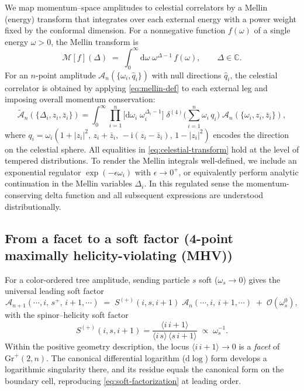 \documentclass[11pt]{article}
\begin{document}
We map momentum–space amplitudes to celestial correlators by a Mellin (energy) transform that integrates over each external energy with a power weight fixed by the conformal dimension. For a nonnegative function \(f(\omega)\) of a single energy \(\omega>0\), the Mellin transform is
\begin{equation}
\mathcal{M}[f](\Delta)
\;=\;
\int_{0}^{\infty}\!\mathrm{d}\omega\;
\omega^{\Delta-1}\,f(\omega),
\qquad
\Delta\in\mathbb{C}.
\label{eq:mellin-def}
\end{equation}
For an \(n\)-point amplitude \(\mathcal{A}_n(\{\omega_i,\hat{q}_i\})\) with null directions \(\hat{q}_i\), the celestial correlator is obtained by applying \eqref{eq:mellin-def} to each external leg and imposing overall momentum conservation:
\begin{equation}
\widetilde{\mathcal{A}}_n(\{\Delta_i,z_i,\bar z_i\})
=
\int_0^\infty \!\!\prod_{i=1}^{n}\Big[\mathrm{d}\omega_i\;\omega_i^{\Delta_i-1}\Big]\;
\delta^{(4)}\!\Big(\sum_{i=1}^{n}\omega_i\,q_i\Big)\;
\mathcal{A}_n(\{\omega_i,z_i,\bar z_i\}),
\label{eq:celestial-transform}
\end{equation}
where \(q_i=\omega_i(1+\lvert z_i\rvert^2,\,z_i+\bar z_i,\,-\mathrm{i}(z_i-\bar z_i),\,1-\lvert z_i\rvert^2)\) encodes the direction on the celestial sphere.
All equalities in \eqref{eq:celestial-transform} hold at the level of tempered distributions.
To render the Mellin integrals well-defined, we include an exponential regulator
\(\exp(-\epsilon \omega_i)\) with \(\epsilon \to 0^+\),
or equivalently perform analytic continuation in the Mellin variables \(\Delta_i\).
In this regulated sense the momentum-conserving delta function and all subsequent
expressions are understood distributionally.

\subsection{From a facet to a soft factor (4-point maximally helicity-violating (MHV))}
For a color-ordered tree amplitude, sending particle \(s\) soft (\(\omega_s\to0\)) gives the universal leading soft factor
\begin{equation}
\mathcal{A}_{n+1}(\cdots,i,\,s^{+},\,i{+}1,\cdots)
\;=\;
S^{(+)}(i,s,i{+}1)\;\mathcal{A}_{n}(\cdots,i,\,i{+}1,\cdots)
\;+\;\mathcal{O}(\omega_s^{0}),
\label{eq:soft-factorization}
\end{equation}
with the spinor–helicity soft factor
\begin{equation}
S^{(+)}(i,s,i{+}1)
=
\frac{\langle i\,i{+}1\rangle}{\langle i\,s\rangle\,\langle s\,i{+}1\rangle}
\;\propto\;\omega_s^{-1}.
\label{eq:soft-factor}
\end{equation}
Within the positive geometry description, the locus \(\langle i\,i{+}1\rangle\!\to\!0\) is a \emph{facet} of \(\mathrm{Gr}^+(2,n)\). The canonical differential logarithm (\(\mathrm{d}\!\log\)) form develops a logarithmic singularity there, and its residue equals the canonical form on the boundary cell, reproducing \eqref{eq:soft-factorization} at leading order.
\end{document}
